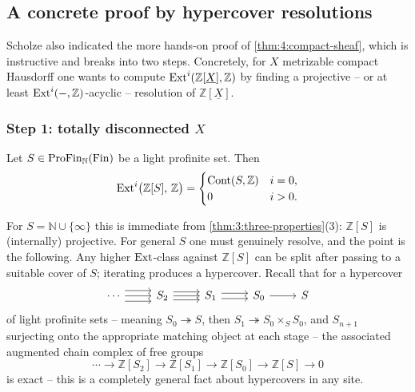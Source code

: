 \subsection{A concrete proof by hypercover resolutions}

Scholze also indicated the more hands-on proof of \cref{thm:4:compact-sheaf},
which is instructive and breaks into two steps. Concretely, for $X$ metrizable
compact Hausdorff one wants to compute $\operatorname{Ext}^{i}(\mathbb{Z}[\underline{X}],
\mathbb{Z})$ by finding a projective -- or at least $\operatorname{Ext}^i(-,\mathbb{Z})$-acyclic
-- resolution of $\mathbb{Z}[\underline{X}]$.

\subsubsection*{Step 1: totally disconnected \texorpdfstring{$X$}{X}}

\begin{proposition}
\label{prop:4:profinite-acyclic}
Let $S\in\mathrm{ProFin}_{\mathbb{N}}(\mathrm{Fin})$ be a light profinite set. Then
\begin{equation*}
\operatorname{Ext}^{i}\bigl(\mathbb{Z}[S],\,\mathbb{Z}\bigr)=
\begin{cases}
\operatorname{Cont}(S,\mathbb{Z}) & i=0,\\
0 & i>0.
\end{cases}
\end{equation*}
\end{proposition}

For $S=\mathbb{N}\cup\{\infty\}$ this is immediate from
\cref{thm:3:three-properties}(3): $\mathbb{Z}[S]$ is (internally) projective. For
general $S$ one must genuinely resolve, and the point is the following. Any
higher $\operatorname{Ext}$-class against $\mathbb{Z}[S]$ can be split after passing to a
suitable cover of $S$; iterating produces a hypercover. Recall that for a
hypercover
\[
\begin{tikzcd}
\cdots \arrow[r, shift left=2] \arrow[r] \arrow[r, shift right=2]
& S_2 \arrow[r, shift left=1.5] \arrow[r] \arrow[r, shift right=1.5]
& S_1 \arrow[r, shift left=1] \arrow[r, shift right=1]
& S_0 \arrow[r]
& S
\end{tikzcd}
\]
of light profinite sets -- meaning $S_0\twoheadrightarrow S$, then
$S_1\twoheadrightarrow S_0\times_S S_0$, and $S_{n+1}$ surjecting onto the
appropriate matching object at each stage -- the associated augmented chain
complex of free groups
\begin{equation}
\label{eq:4:hypercover-chain}
\cdots\to\mathbb{Z}[S_2]\to\mathbb{Z}[S_1]\to\mathbb{Z}[S_0]\to\mathbb{Z}[S]\to0
\end{equation}
is exact -- this is a completely general fact about hypercovers in any site.


